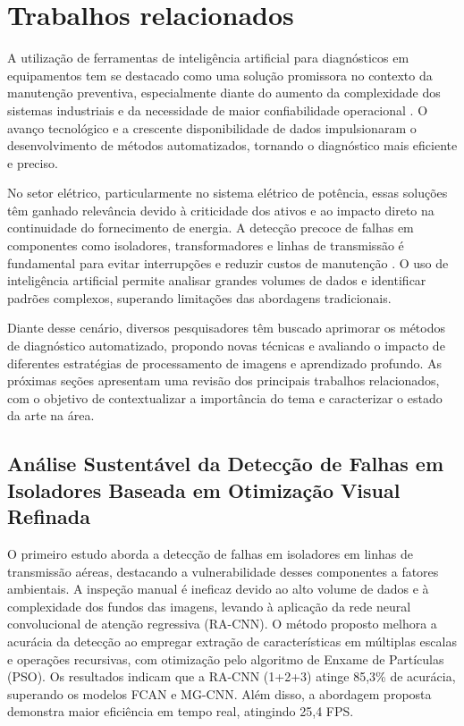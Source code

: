 \chapter{Trabalhos relacionados}

A utilização de ferramentas de inteligência artificial para diagnósticos em equipamentos tem se destacado como uma solução promissora no contexto da manutenção preventiva, especialmente diante do aumento da complexidade dos sistemas industriais e da necessidade de maior confiabilidade operacional \cite{Salvi2021}. O avanço tecnológico e a crescente disponibilidade de dados impulsionaram o desenvolvimento de métodos automatizados, tornando o diagnóstico mais eficiente e preciso.

No setor elétrico, particularmente no sistema elétrico de potência, essas soluções têm ganhado relevância devido à criticidade dos ativos e ao impacto direto na continuidade do fornecimento de energia. A detecção precoce de falhas em componentes como isoladores, transformadores e linhas de transmissão é fundamental para evitar interrupções e reduzir custos de manutenção \cite{wang2023}. O uso de inteligência artificial permite analisar grandes volumes de dados e identificar padrões complexos, superando limitações das abordagens tradicionais.

Diante desse cenário, diversos pesquisadores têm buscado aprimorar os métodos de diagnóstico automatizado, propondo novas técnicas e avaliando o impacto de diferentes estratégias de processamento de imagens e aprendizado profundo. As próximas seções apresentam uma revisão dos principais trabalhos relacionados, com o objetivo de contextualizar a importância do tema e caracterizar o estado da arte na área.

\section{Análise Sustentável da Detecção de Falhas em Isoladores Baseada em Otimização Visual Refinada}
O primeiro estudo aborda a detecção de falhas em isoladores em linhas de transmissão aéreas, destacando a vulnerabilidade desses componentes a fatores ambientais. A inspeção manual é ineficaz devido ao alto volume de dados e à complexidade dos fundos das imagens, levando à aplicação da rede neural convolucional de atenção regressiva (RA-CNN). O método proposto melhora a acurácia da detecção ao empregar extração de características em múltiplas escalas e operações recursivas, com otimização pelo algoritmo de Enxame de Partículas (PSO). Os resultados indicam que a RA-CNN (1+2+3) atinge 85,3\% de acurácia, superando os modelos FCAN e MG-CNN. Além disso, a abordagem proposta demonstra maior eficiência em tempo real, atingindo 25,4 FPS. \cite{wang2023}

